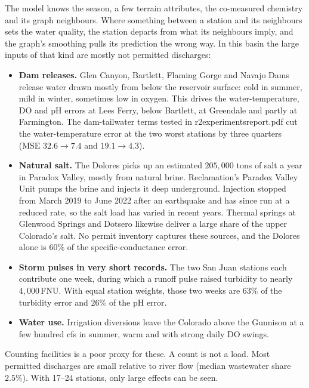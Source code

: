 \documentclass[11pt]{article}
\newcommand{\codeus}{\textunderscore\allowbreak}
\newcommand{\code}[1]{{\ttfamily\let\_\codeus #1}}
\begin{document}
The model knows the season, a few terrain attributes, the co-measured chemistry and its graph
neighbours. Where something between a station and its neighbours sets the water quality, the
station departs from what its neighbours imply, and the graph's smoothing pulls its prediction the
wrong way. In this basin the large inputs of that kind are mostly not permitted discharges:
\begin{itemize}
  \item \textbf{Dam releases.} Glen Canyon, Bartlett, Flaming Gorge and Navajo Dams release water
        drawn mostly from below the reservoir surface: cold in summer, mild in winter, sometimes
        low in oxygen. This drives the
        water-temperature, DO and pH errors at Lees Ferry, below Bartlett, at Greendale and partly
        at Farmington. The dam-tailwater terms tested in \code{r2\_experiments\_report.pdf} cut the
        water-temperature error at the two worst stations by three quarters (MSE $32.6\to7.4$ and
        $19.1\to4.3$).
  \item \textbf{Natural salt.} The Dolores picks up an estimated $205{,}000$ tons of salt a year in
        Paradox Valley, mostly from natural brine. Reclamation's Paradox Valley Unit pumps the brine
        and injects it deep underground. Injection stopped from March 2019 to June 2022 after an
        earthquake and has since run at a reduced rate, so the salt load has varied in recent
        years. Thermal springs at Glenwood Springs and Dotsero likewise deliver a large share of the
        upper Colorado's salt. No permit inventory captures these sources, and the Dolores alone is
        $60\%$ of the specific-conductance error.
  \item \textbf{Storm pulses in very short records.} The two San Juan stations each contribute one
        week, during which a runoff pulse raised turbidity to nearly $4{,}000$\,FNU. With equal
        station weights, those two weeks are $63\%$ of the turbidity error and $26\%$ of the pH
        error.
  \item \textbf{Water use.} Irrigation diversions leave the Colorado above the Gunnison at a
        few hundred cfs in summer, warm and with strong daily DO swings.
\end{itemize}
Counting facilities is a poor proxy for these. A count is not a load. Most permitted discharges
are small relative to river flow (median wastewater share $2.5\%$). With 17--24 stations, only
large effects can be seen.

\end{document}
